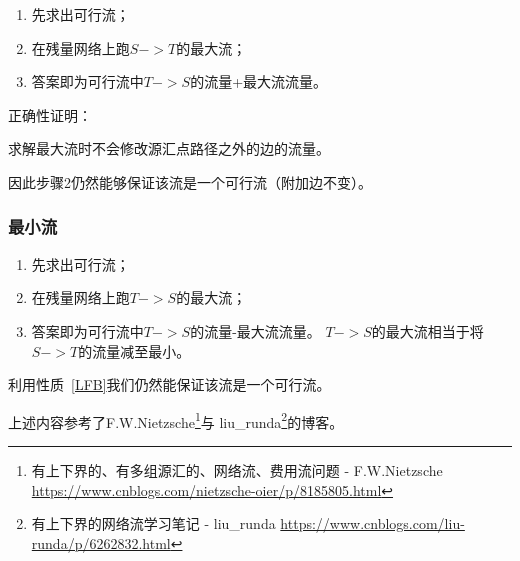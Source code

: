 \begin{enumerate}
    \item 先求出可行流；
    \item 在残量网络上跑$S->T$的最大流；
    \item 答案即为可行流中$T->S$的流量+最大流流量。
\end{enumerate}

正确性证明：

\begin{property}\label{LFB}
    求解最大流时不会修改源汇点路径之外的边的流量。
\end{property}

因此步骤2仍然能够保证该流是一个可行流（附加边不变）。

\subsubsection{最小流}

\begin{enumerate}
    \item 先求出可行流；
    \item 在残量网络上跑$T->S$的最大流；
    \item 答案即为可行流中$T->S$的流量-最大流流量。
    $T->S$的最大流相当于将$S->T$的流量减至最小。
\end{enumerate}

利用性质~\ref{LFB}我们仍然能保证该流是一个可行流。

上述内容参考了F.W.Nietzsche\footnote{有上下界的、有多组源汇的、网络流、费用流问题 - F.W.Nietzsche
\url{https://www.cnblogs.com/nietzsche-oier/p/8185805.html}}与
liu\_runda\footnote{有上下界的网络流学习笔记 - liu\_runda
\url{https://www.cnblogs.com/liu-runda/p/6262832.html}}的博客。
